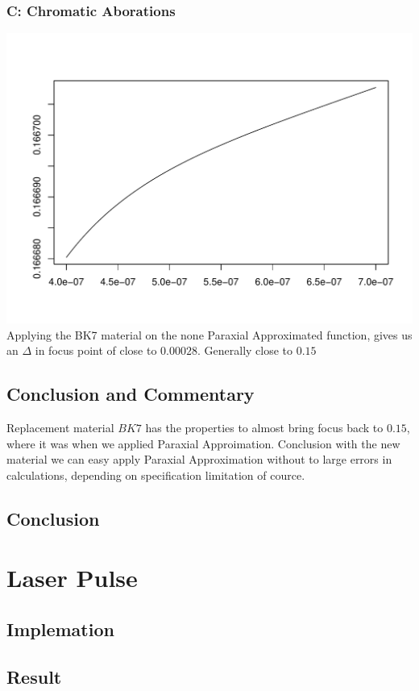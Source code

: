 \documentclass[12pt]{article}
\begin{document}
\subsubsection{C: Chromatic Aborations}
\includegraphics[scale=0.6]{BK7_abo.pdf}
Applying the BK7 material on the none Paraxial Approximated function, gives us
an $\Delta$ in focus point of close to $0.00028$. Generally close to $0.15$

\subsection{Conclusion and Commentary}
Replacement material $BK7$ has the properties to almost bring focus back to $0.15$, where it was when we applied Paraxial Approimation. 
Conclusion with the new material we can easy apply Paraxial Approximation
without to large errors in calculations, depending on specification limitation of cource. 

\subsection{Conclusion}

\section{Laser Pulse}

\subsection{Implemation}

\subsection{Result}
\end{document}
